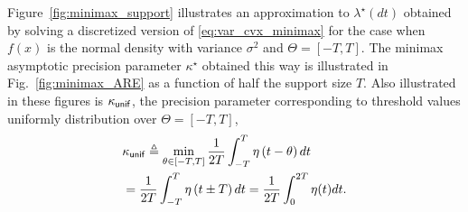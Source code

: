 Figure~\ref{fig:minimax_support} illustrates an approximation to
$\lambda^\star(dt)$ obtained by solving a discretized version of
\eqref{eq:var_cvx_minimax} for the case when $f(x)$ is the normal density
with variance $\sigma^2$ and $\Theta = [-T,T]$. The minimax asymptotic
precision parameter $\kappa^\star$ obtained this way is illustrated in
Fig.~\ref{fig:minimax_ARE} as a function of half the support size $T$. Also
illustrated in these figures is $\kappa_{\mathsf{unif}}$, the precision
parameter corresponding to threshold values uniformly distribution over
$\Theta = [-T,T]$,
\begin{align}
& \kappa_{\mathsf{unif}} \triangleq \min_{\theta \in [-T,T]} \frac{1}{2T}\int_{-T}^T \eta\left(t-\theta\right) dt \nonumber
 \\
& = 
\frac{1}{2T}\int_{-T}^{T} \eta\left(t\pm T\right) dt
= \frac{1}{2T}\int_{0}^{2T} \eta(t) dt  \label{eq:uniform_risk}. 
\end{align}

